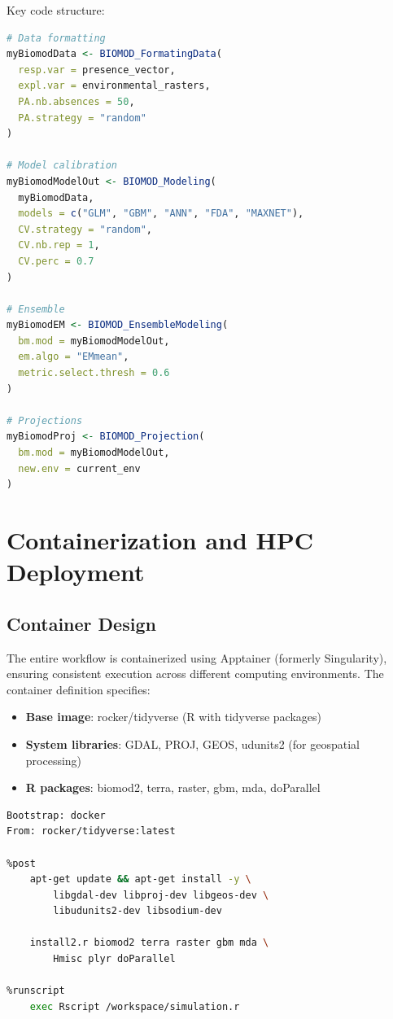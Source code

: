 \documentclass[12pt,a4paper]{report}
\begin{document}
Key code structure:

\begin{lstlisting}[language=R]
# Data formatting
myBiomodData <- BIOMOD_FormatingData(
  resp.var = presence_vector,
  expl.var = environmental_rasters,
  PA.nb.absences = 50,
  PA.strategy = "random"
)

# Model calibration
myBiomodModelOut <- BIOMOD_Modeling(
  myBiomodData,
  models = c("GLM", "GBM", "ANN", "FDA", "MAXNET"),
  CV.strategy = "random",
  CV.nb.rep = 1,
  CV.perc = 0.7
)

# Ensemble
myBiomodEM <- BIOMOD_EnsembleModeling(
  bm.mod = myBiomodModelOut,
  em.algo = "EMmean",
  metric.select.thresh = 0.6
)

# Projections
myBiomodProj <- BIOMOD_Projection(
  bm.mod = myBiomodModelOut,
  new.env = current_env
)
\end{lstlisting}

\chapter{Containerization and HPC Deployment}

\section{Container Design}

The entire workflow is containerized using Apptainer (formerly Singularity), ensuring consistent execution across different computing environments. The container definition specifies:

\begin{itemize}
    \item \textbf{Base image}: rocker/tidyverse (R with tidyverse packages)
    \item \textbf{System libraries}: GDAL, PROJ, GEOS, udunits2 (for geospatial processing)
    \item \textbf{R packages}: biomod2, terra, raster, gbm, mda, doParallel
\end{itemize}

\begin{lstlisting}[language=bash]
Bootstrap: docker
From: rocker/tidyverse:latest

%post
    apt-get update && apt-get install -y \
        libgdal-dev libproj-dev libgeos-dev \
        libudunits2-dev libsodium-dev
    
    install2.r biomod2 terra raster gbm mda \
        Hmisc plyr doParallel

%runscript
    exec Rscript /workspace/simulation.r
\end{lstlisting}
\end{document}

